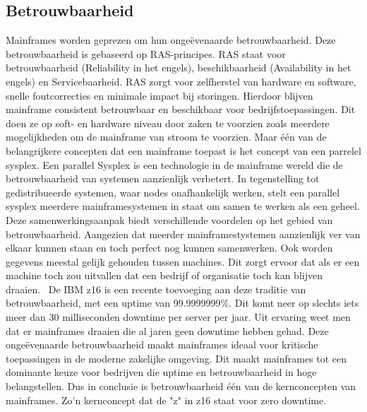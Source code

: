 \subsection{Betrouwbaarheid}
Mainframes worden geprezen om hun ongeëvenaarde betrouwbaarheid. Deze betrouwbaarheid is gebaseerd op RAS-principes. RAS staat voor betrouwbaarheid (Reliability in het engels), beschikbaarheid (Availability in het engels) en Servicebaarheid. RAS zorgt voor zelfherstel van hardware en software, snelle foutcorrecties en minimale impact bij storingen. Hierdoor blijven mainframe consistent betrouwbaar en beschikbaar voor bedrijfstoepassingen. Dit doen ze op soft- en hardware niveau door zaken te voorzien zoals meerdere mogelijkheden om de mainframe van stroom te voorzien. Maar één van de belangrijkere concepten dat een mainframe toepast is het concept van een parrelel sysplex. Een parallel Sysplex is een technologie in de mainframe wereld die de betrouwbaarheid van systemen aanzienlijk verbetert. In tegenstelling tot gedistribueerde systemen, waar nodes onafhankelijk werken, stelt een parallel sysplex meerdere mainframesystemen in staat om samen te werken als een geheel. Deze samenwerkingsaanpak biedt verschillende voordelen op het gebied van betrouwbaarheid. Aangezien dat meerder mainframestystemen aanzienlijk ver van elkaar kunnen staan en toch perfect nog kunnen samenwerken. Ook worden gegevens meestal gelijk gehouden tussen machines. Dit zorgt ervoor dat als er een machine toch zou uitvallen dat een bedrijf of organisatie toch kan blijven draaien.~\autocite{FrankJDGilio,maincom,Subhasish2020}
De IBM z16 is een recente toevoeging aan deze traditie van betrouwbaarheid, met een uptime van 99.9999999\%. Dit komt neer op slechts iets meer dan 30 milliseconden downtime per server per jaar. Uit ervaring weet men dat er mainframes draaien die al jaren geen downtime hebben gehad. Deze ongeëvenaarde betrouwbaarheid maakt mainframes ideaal voor kritische toepassingen in de moderne zakelijke omgeving. Dit maakt mainframes tot een dominante keuze voor bedrijven die uptime en betrouwbaarheid in hoge belangstellen. Dus in conclusie is betrouwbaarheid één van de kernconcepten van mainframes. Zo'n kernconcept dat de "z" in z16 staat voor zero downtime. ~\autocite{IBM2023(3),JasonBloomberg,RobEnderle}


